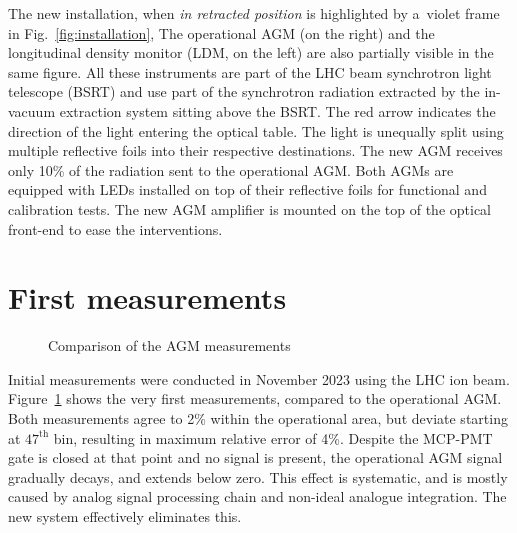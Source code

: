 The new installation, when \textit{in retracted position} is  highlighted by a~violet frame in Fig.~\ref{fig:installation}, 
%
The operational AGM  (on the right) and  the longitudinal density monitor (LDM, on the left) are also partially visible in the same figure. 
%
All these instruments are part of the LHC beam synchrotron light telescope (BSRT) and use part of the synchrotron radiation extracted by the in-vacuum extraction system sitting above the BSRT.
%
The red arrow indicates the direction of the light entering the optical table.
%
The light is unequally split using multiple reflective foils into their respective destinations.  The new AGM receives  only 10\% of the radiation sent to the operational AGM.
%
Both AGMs are equipped with LEDs installed  on top of their reflective foils for functional and calibration tests. 
%
%
The new AGM amplifier is mounted on the top of the optical front-end to ease the interventions.

\section{First measurements}

\vspace{-5mm}
\begin{figure}[!htb]
    \begin{center}
        \scalebox{0.54}{}
        \caption{Comparison of the AGM measurements}
        \label{fig:comparison_chart}
    \end{center}
\end{figure}

\vspace{-5mm}
Initial measurements were conducted in November 2023 using the LHC ion beam.
%
Figure~\ref{fig:comparison_chart} shows the very first measurements, compared to the operational AGM.
%
Both measurements agree to 2\% within the operational area, but deviate starting at $47^{\text{th}}$ bin, resulting in maximum relative error of 4\%.
Despite the MCP-PMT gate is closed at that point and no signal is present, the operational AGM signal gradually decays, and extends below zero.
%
%
This effect is systematic, and is mostly caused by analog signal processing chain and non-ideal analogue integration.
%
The new system effectively eliminates this.


